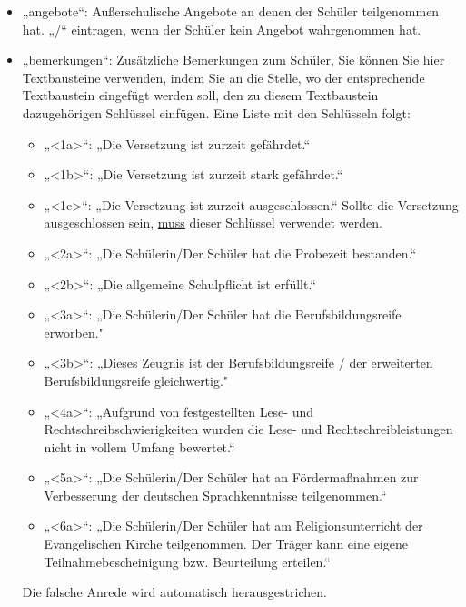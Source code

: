 \documentclass[a4paper,10pt]{scrartcl}
\begin{document}
\begin{itemize}
         \item „angebote“: Außerschulische Angebote an denen der Schüler teilgenommen hat. „/“ eintragen, wenn der Schüler kein Angebot wahrgenommen hat.
         \item „bemerkungen“: Zusätzliche Bemerkungen zum Schüler, \newline
	 Sie können Sie hier Textbausteine verwenden, indem Sie an die Stelle, wo der entsprechende Textbaustein eingefügt werden soll, den zu diesem Textbaustein dazugehörigen Schlüssel einfügen. Eine Liste mit den Schlüsseln folgt:
	 \begin{itemize}
	    \item „<1a>“: „Die Versetzung ist zurzeit gefährdet.“
            \item „<1b>“: „Die Versetzung ist zurzeit stark gefährdet.“
            \item „<1c>“: „Die Versetzung ist zurzeit ausgeschlossen.“ Sollte die Versetzung ausgeschlossen sein, \underline{muss} dieser Schlüssel verwendet werden.
            \newline            
	    \item „<2a>“: „Die Schülerin/Der Schüler hat die Probezeit bestanden.“
            \item „<2b>“: „Die allgemeine Schulpflicht ist erfüllt.“
            \newline
	    \item „<3a>“: „Die Schülerin/Der Schüler hat die Berufsbildungsreife erworben."
	    \item „<3b>“: „Dieses Zeugnis ist der Berufsbildungsreife / der erweiterten Berufsbildungsreife gleichwertig."
            \newline
	    \item „<4a>“: „Aufgrund von festgestellten Lese- und Rechtschreibschwierigkeiten wurden die Lese- und Rechtschreibleistungen nicht in vollem Umfang bewertet.“
	    \newline
            \item „<5a>“: „Die Schülerin/Der Schüler hat an Fördermaßnahmen zur Verbesserung der deutschen Sprachkenntnisse teilgenommen.“
            \newline
            \item „<6a>“: „Die Schülerin/Der Schüler hat am Religionsunterricht der Evangelischen Kirche teilgenommen. Der Träger kann eine eigene Teilnahmebescheinigung bzw. Beurteilung erteilen.“
         \end{itemize}
	 Die falsche Anrede wird automatisch herausgestrichen.
      \end{itemize}
\end{document}

